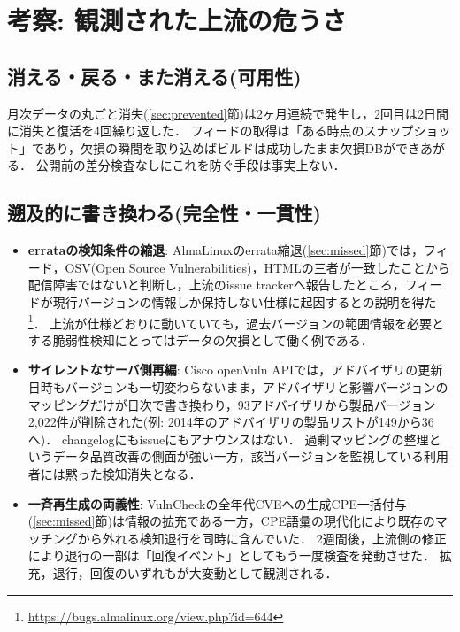 \documentclass{css}
\begin{document}
\section{考察: 観測された上流の危うさ}
\label{sec:discussion}

\subsection{消える・戻る・また消える(可用性)}
\label{sec:avail}

月次データの丸ごと消失(\ref{sec:prevented}節)は2ヶ月連続で発生し，2回目は2日間に消失と復活を4回繰り返した．
フィードの取得は「ある時点のスナップショット」であり，欠損の瞬間を取り込めばビルドは成功したまま欠損DBができあがる．
公開前の差分検査なしにこれを防ぐ手段は事実上ない．

\subsection{遡及的に書き換わる(完全性・一貫性)}
\label{sec:integrity}

\begin{itemize}
\item \textbf{errataの検知条件の縮退}:
AlmaLinuxのerrata縮退(\ref{sec:missed}節)では，フィード，OSV(Open Source Vulnerabilities)，HTMLの三者が一致したことから配信障害ではないと判断し，上流のissue trackerへ報告したところ，フィードが現行バージョンの情報しか保持しない仕様に起因するとの説明を得た\footnote{\url{https://bugs.almalinux.org/view.php?id=644}}．
上流が仕様どおりに動いていても，過去バージョンの範囲情報を必要とする脆弱性検知にとってはデータの欠損として働く例である．
\item \textbf{サイレントなサーバ側再編}:
Cisco openVuln APIでは，アドバイザリの更新日時もバージョンも一切変わらないまま，アドバイザリと影響バージョンのマッピングだけが日次で書き換わり，93アドバイザリから製品バージョン2,022件が削除された(例: 2014年のアドバイザリの製品リストが149から36へ)．
changelogにもissueにもアナウンスはない．
過剰マッピングの整理というデータ品質改善の側面が強い一方，該当バージョンを監視している利用者には黙った検知消失となる．
\item \textbf{一斉再生成の両義性}:
VulnCheckの全年代CVEへの生成CPE一括付与(\ref{sec:missed}節)は情報の拡充である一方，CPE語彙の現代化により既存のマッチングから外れる検知退行を同時に含んでいた．
2週間後，上流側の修正により退行の一部は「回復イベント」としてもう一度検査を発動させた．
拡充，退行，回復のいずれもが大変動として観測される．
\end{itemize}
\end{document}
